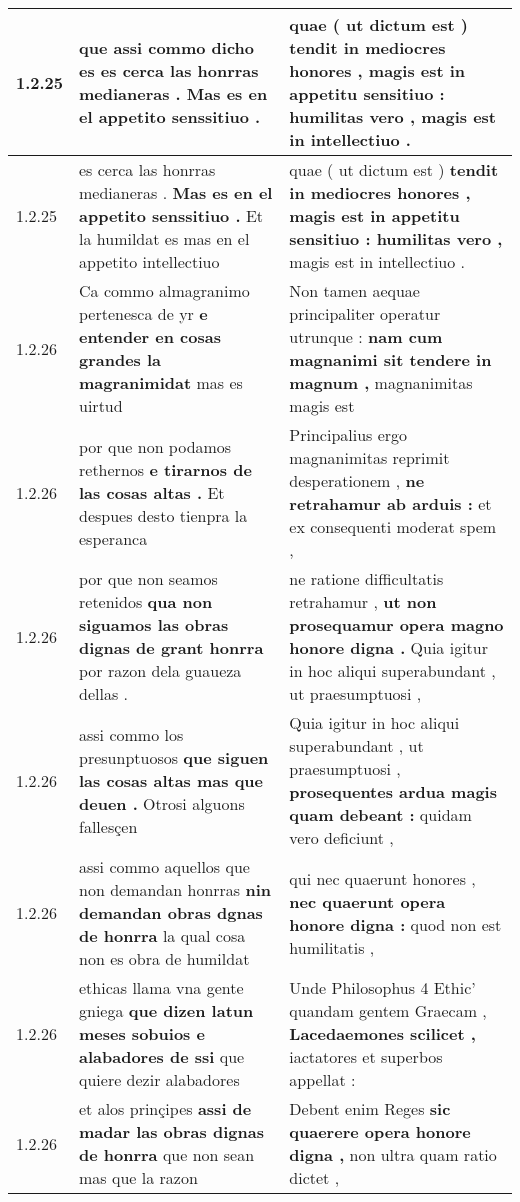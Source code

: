 \begin{tabular}{|p{1cm}|p{6.5cm}|p{6.5cm}|}
1.2.25 & que assi commo dicho es \textbf{ es cerca las honrras medianeras . } Mas es en el appetito senssitiuo . & quae ( ut dictum est ) \textbf{ tendit in mediocres honores , magis est in appetitu sensitiuo : humilitas vero , } magis est in intellectiuo . \\\hline
1.2.25 & es cerca las honrras medianeras . \textbf{ Mas es en el appetito senssitiuo . } Et la humildat es mas en el appetito intellectiuo & quae ( ut dictum est ) \textbf{ tendit in mediocres honores , magis est in appetitu sensitiuo : humilitas vero , } magis est in intellectiuo . \\\hline
1.2.26 & Ca commo almagranimo pertenesca de yr \textbf{ e entender en cosas grandes la magranimidat } mas es uirtud & Non tamen aequae principaliter operatur utrunque : \textbf{ nam cum magnanimi sit tendere in magnum , } magnanimitas magis est \\\hline
1.2.26 & por que non podamos rethernos \textbf{ e tirarnos de las cosas altas . } Et despues desto tienpra la esperanca & Principalius ergo magnanimitas reprimit desperationem , \textbf{ ne retrahamur ab arduis : } et ex consequenti moderat spem , \\\hline
1.2.26 & por que non seamos retenidos \textbf{ qua non siguamos las obras dignas de grant honrra } por razon dela guaueza dellas . & ne ratione difficultatis retrahamur , \textbf{ ut non prosequamur opera magno honore digna . } Quia igitur in hoc aliqui superabundant , ut praesumptuosi , \\\hline
1.2.26 & assi commo los presunptuosos \textbf{ que siguen las cosas altas mas que deuen . } Otrosi alguons fallesçen & Quia igitur in hoc aliqui superabundant , ut praesumptuosi , \textbf{ prosequentes ardua magis quam debeant : } quidam vero deficiunt , \\\hline
1.2.26 & assi commo aquellos que non demandan honrras \textbf{ nin demandan obras dgnas de honrra } la qual cosa non es obra de humildat & qui nec quaerunt honores , \textbf{ nec quaerunt opera honore digna : } quod non est humilitatis , \\\hline
1.2.26 & ethicas llama vna gente gniega \textbf{ que dizen latun meses sobuios e alabadores de ssi } que quiere dezir alabadores & Unde Philosophus 4 Ethic’ quandam gentem Graecam , \textbf{ Lacedaemones scilicet , } iactatores et superbos appellat : \\\hline
1.2.26 & et alos prinçipes \textbf{ assi de madar las obras dignas de honrra } que non sean mas que la razon & Debent enim Reges \textbf{ sic quaerere opera honore digna , } non ultra quam ratio dictet , \\\hline

\end{tabular}
